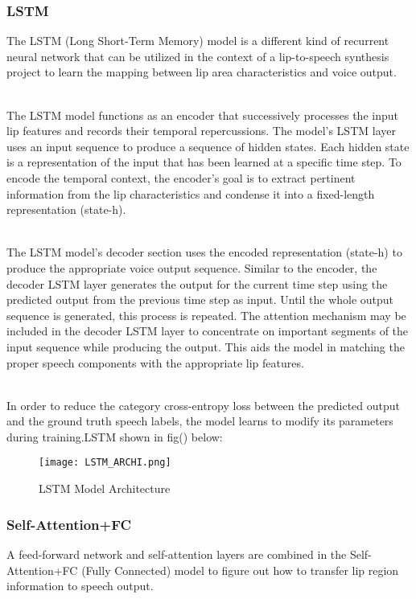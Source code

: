 \documentclass[conference]{IEEEtran}
\begin{document}
\subsubsection{LSTM}
The LSTM (Long Short-Term Memory) model is a different kind of recurrent neural network that can be utilized in the context of a lip-to-speech synthesis project to learn the mapping between lip area characteristics and voice output.

\\ The LSTM model functions as an encoder that successively processes the input lip features and records their temporal repercussions. The model's LSTM layer uses an input sequence to produce a sequence of hidden states. Each hidden state is a representation of the input that has been learned at a specific time step. To encode the temporal context, the encoder's goal is to extract pertinent information from the lip characteristics and condense it into a fixed-length representation (state-h).

\\ The LSTM model's decoder section uses the encoded representation (state-h) to produce the appropriate voice output sequence. Similar to the encoder, the decoder LSTM layer generates the output for the current time step using the predicted output from the previous time step as input. Until the whole output sequence is generated, this process is repeated. The attention mechanism may be included in the decoder LSTM layer to concentrate on important segments of the input sequence while producing the output. This aids the model in matching the proper speech components with the appropriate lip features.

\\ In order to reduce the category cross-entropy loss between the predicted output and the ground truth speech labels, the model learns to modify its parameters during training.LSTM shown in fig() below:

\begin{figure}[htbp]
\centerline{\texttt{[image: LSTM\_ARCHI.png]}}
\caption{LSTM Model Architecture}
\label{fig}
\end{figure}

\subsubsection{Self-Attention+FC}
A feed-forward network and self-attention layers are combined in the Self-Attention+FC (Fully Connected) model to figure out how to transfer lip region information to speech output.
\end{document}
